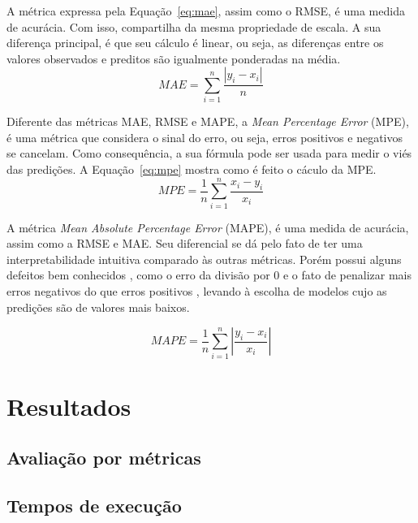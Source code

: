 A métrica expressa pela Equação~\ref{eq:mae}, assim como o RMSE, é uma medida de acurácia. Com isso, compartilha da mesma propriedade de escala. A sua diferença principal, é que seu cálculo é linear, ou seja, as diferenças entre os valores observados e preditos são igualmente ponderadas na média.
\begin{equation} \label{eq:mae}
    MAE=\sum ^{n}_{i=1}\dfrac{\left| y_{i}-x_{i}\right| }{n}
\end{equation}

Diferente das métricas MAE, RMSE e MAPE, a \textit{Mean Percentage Error} (MPE), é uma métrica que considera o sinal do erro, ou seja, erros positivos e negativos se cancelam. Como consequência, a sua fórmula pode ser usada para medir o viés das predições. A Equação~\ref{eq:mpe} mostra como é feito o cáculo da MPE.
\begin{equation} \label{eq:mpe}
    MPE=\dfrac{1}{n}\sum ^{n}_{i=1}\dfrac{x_{i}-y_{i}}{x_{i}}
\end{equation}

A métrica \textit{Mean Absolute Percentage Error} (MAPE), é uma medida de acurácia, assim como a RMSE e MAE. Seu diferencial se dá pelo fato de ter uma interpretabilidade intuitiva comparado às outras métricas. Porém possui alguns defeitos bem conhecidos \cite{CHRISTOFALLIS2015}, como o erro da divisão por 0 e o fato de penalizar mais erros negativos do que erros positivos \cite{MAKRIDAKIS1993527}, levando à escolha de modelos cujo as predições são de valores mais baixos.


\begin{equation} \label{eq:mape}
    MAPE=\dfrac{1}{n}\sum ^{n}_{i=1}\left| \dfrac{y_{i}-x_{i}}{x_{i}}\right|
\end{equation}

\section{Resultados}

\subsection{Avaliação por métricas}



\subsection{Tempos de execução}

